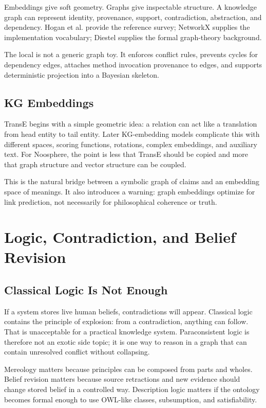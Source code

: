 \documentclass[11pt]{article}
\newcommand{\code}[1]{\texttt{\detokenize{#1}}}
\begin{document}
Embeddings give soft geometry. Graphs give inspectable structure. A knowledge
graph can represent identity, provenance, support, contradiction, abstraction,
and dependency. Hogan et al. provide the reference survey; NetworkX supplies the
implementation vocabulary; Diestel supplies the formal graph-theory background.

The local \code{CascadeGraph} is not a generic graph toy. It enforces conflict
rules, prevents cycles for dependency edges, attaches method invocation
provenance to edges, and supports deterministic projection into a Bayesian
skeleton.

\subsection{KG Embeddings}

TransE begins with a simple geometric idea: a relation can act like a
translation from head entity to tail entity. Later KG-embedding models complicate
this with different spaces, scoring functions, rotations, complex embeddings,
and auxiliary text. For Noosphere, the point is less that TransE should be
copied and more that graph structure and vector structure can be coupled.

This is the natural bridge between a symbolic graph of claims and an embedding
space of meanings. It also introduces a warning: graph embeddings optimize for
link prediction, not necessarily for philosophical coherence or truth.

\section{Logic, Contradiction, and Belief Revision}

\subsection{Classical Logic Is Not Enough}

If a system stores live human beliefs, contradictions will appear. Classical
logic contains the principle of explosion: from a contradiction, anything can
follow. That is unacceptable for a practical knowledge system. Paraconsistent
logic is therefore not an exotic side topic; it is one way to reason in a graph
that can contain unresolved conflict without collapsing.

Mereology matters because principles can be composed from parts and wholes.
Belief revision matters because source retractions and new evidence should
change stored belief in a controlled way. Description logic matters if the
ontology becomes formal enough to use OWL-like classes, subsumption, and
satisfiability.
\end{document}
